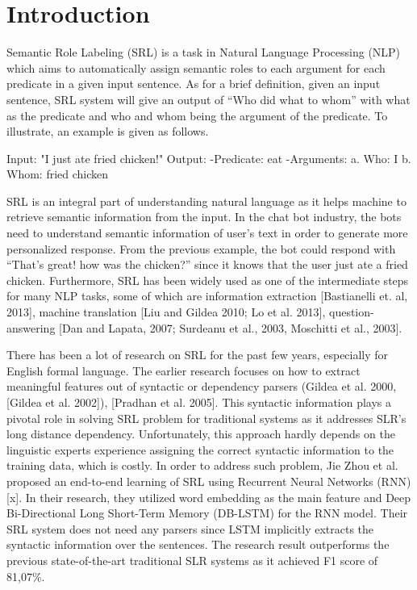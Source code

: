 \section{Introduction}
Semantic Role Labeling (SRL) is a task in Natural Language Processing (NLP) which aims to automatically assign semantic roles to each argument for each predicate in a given input sentence. As for a brief definition, given an input sentence, SRL system will give an output of “Who did what to whom” with what as the predicate and who and whom being the argument of the predicate. To illustrate, an example is given as follows.

Input: "I just ate fried chicken!"
Output:
-Predicate: eat
-Arguments:
a. Who: I
b. Whom: fried chicken

SRL is an integral part of understanding natural language as it helps machine to retrieve semantic information from the input. In the chat bot industry, the bots need to understand semantic information of user’s text in order to generate more personalized response. From the previous example, the bot could respond with “That’s great! how was the chicken?” since it knows that the user just ate a fried chicken. Furthermore, SRL has been widely used as one of the intermediate steps for many NLP tasks, some of which are information extraction [Bastianelli et. al, 2013], machine translation [Liu and Gildea 2010; Lo et al. 2013], question-answering [Dan and Lapata, 2007; Surdeanu et al., 2003, Moschitti et al., 2003].

There has been a lot of research on SRL for the past few years, especially for English formal language. The earlier research focuses on how to extract meaningful features out of syntactic or dependency parsers (Gildea et al. 2000, [Gildea et al. 2002]), [Pradhan et al. 2005].  This syntactic information plays a pivotal role in solving SRL problem for traditional systems as it addresses SLR’s long distance dependency. Unfortunately, this approach hardly depends on the linguistic experts experience assigning the correct syntactic information to the training data, which is costly. In order to address such problem, Jie Zhou et al. proposed an end-to-end learning of SRL using Recurrent Neural Networks (RNN) [x]. In their research, they utilized word embedding as the main feature and Deep Bi-Directional Long Short-Term Memory (DB-LSTM) for the RNN model. Their SRL system does not need any parsers since LSTM implicitly extracts the syntactic information over the sentences. The research result outperforms the previous state-of-the-art traditional SLR systems as it achieved F1 score of 81,07\%.


